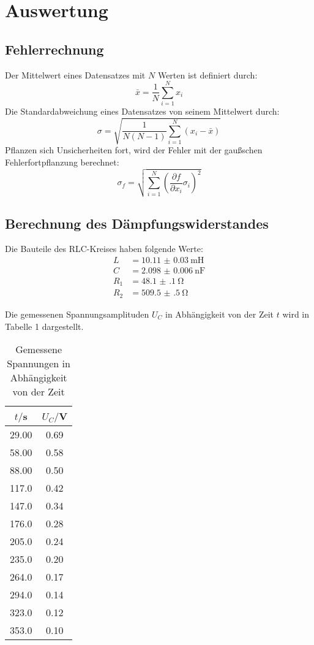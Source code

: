 \section{Auswertung}
\label{sec:Auswertung}

\subsection{Fehlerrechnung}
Der Mittelwert eines Datensatzes mit $N$ Werten ist definiert durch:
\begin{equation}
  \bar{x} = \frac{1}{N} \sum_{i=1}^N x_i
\end{equation}
Die Standardabweichung eines Datensatzes von seinem Mittelwert durch:
\begin{equation}
  \sigma = \sqrt{\frac{1}{N(N-1)} \sum_{i=1}^N (x_i - \bar{x})}
\end{equation}
Pflanzen sich Unsicherheiten fort, wird der Fehler mit der gaußschen
Fehlerfortpflanzung berechnet:
\begin{equation}
  \sigma_f = \sqrt{
      \sum\limits_{i = 1}^N
       \left( \frac{\partial f}{\partial x_i} \sigma_i \right)^{\!\! 2}
     }
\end{equation}


\subsection{Berechnung des Dämpfungswiderstandes}

Die Bauteile des RLC-Kreises haben folgende Werte:
\begin{align*}
  L &= \SI{10.11(3)}{\milli\henry} \\
  C &= \SI{2.098(6)}{\nano\farad} \\
  R_1 &= \SI{48.1(1)}{\ohm} \\
  R_2 &= \SI{509.5(5)}{\ohm}
\end{align*}

Die gemessenen Spannungsamplituden $U_C$ in Abhängigkeit von der Zeit $t$ wird in Tabelle 1 dargestellt.

\begin{table}[H]
  \centering
  \caption{Gemessene Spannungen in Abhängigkeit von der Zeit}
  \label{tab:Spannungsamplitude}
  \begin{tabular}{c c}
    \toprule
    $t/$s & $U_C/$V \\
    \midrule
    29.00 & 0.69 \\
    58.00 & 0.58 \\
    88.00 & 0.50 \\
    117.0 & 0.42 \\
    147.0 & 0.34 \\
    176.0 & 0.28 \\
    205.0 & 0.24 \\
    235.0 & 0.20 \\
    264.0 & 0.17 \\
    294.0 & 0.14 \\
    323.0 & 0.12 \\
    353.0 & 0.10 \\
    \bottomrule
  \end{tabular}
\end{table}

